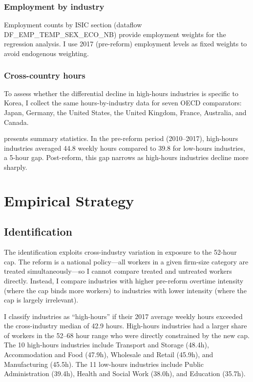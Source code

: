 \documentclass[12pt]{article}
\begin{document}
\subsubsection*{Employment by industry} Employment counts by ISIC section (dataflow DF\_EMP\_\allowbreak{}TEMP\_\allowbreak{}SEX\_\allowbreak{}ECO\_NB) provide employment weights for the regression analysis. I use 2017 (pre-reform) employment levels as fixed weights to avoid endogenous weighting.

\subsubsection*{Cross-country hours} To assess whether the differential decline in high-hours industries is specific to Korea, I collect the same hours-by-industry data for seven OECD comparators: Japan, Germany, the United States, the United Kingdom, France, Australia, and Canada.

 presents summary statistics. In the pre-reform period (2010--2017), high-hours industries averaged 44.8 weekly hours compared to 39.8 for low-hours industries, a 5-hour gap. Post-reform, this gap narrows as high-hours industries decline more sharply.



\section{Empirical Strategy}
\label{sec:strategy}

\subsection{Identification}

The identification exploits cross-industry variation in exposure to the 52-hour cap. The reform is a national policy---all workers in a given firm-size category are treated simultaneously---so I cannot compare treated and untreated workers directly. Instead, I compare industries with higher pre-reform overtime intensity (where the cap binds more workers) to industries with lower intensity (where the cap is largely irrelevant).

I classify industries as ``high-hours'' if their 2017 average weekly hours exceeded the cross-industry median of 42.9 hours. High-hours industries had a larger share of workers in the 52--68 hour range who were directly constrained by the new cap. The 10 high-hours industries include Transport and Storage (48.4h), Accommodation and Food (47.9h), Wholesale and Retail (45.9h), and Manufacturing (45.5h). The 11 low-hours industries include Public Administration (39.4h), Health and Social Work (38.0h), and Education (35.7h).
\end{document}
